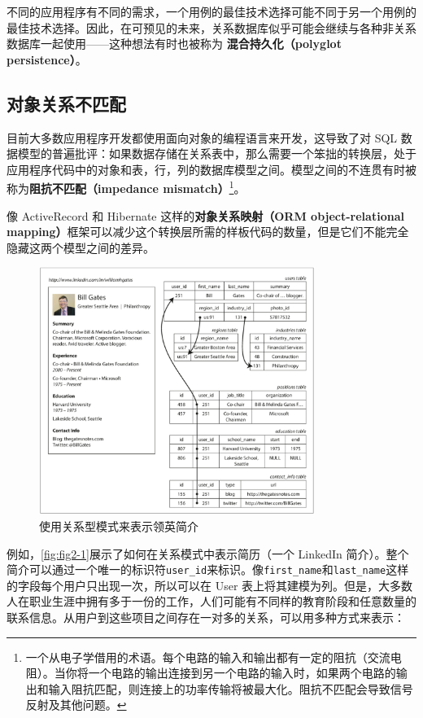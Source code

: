 不同的应用程序有不同的需求，一个用例的最佳技术选择可能不同于另一个用例的最佳技术选择。因此，在可预见的未来，关系数据库似乎可能会继续与各种非关系数据库一起使用——这种想法有时也被称为 \textbf{混合持久化（polyglot persistence）}。

\subsection{对象关系不匹配}

目前大多数应用程序开发都使用面向对象的编程语言来开发，这导致了对 SQL 数据模型的普遍批评：如果数据存储在关系表中，那么需要一个笨拙的转换层，处于应用程序代码中的对象和表，行，列的数据库模型之间。模型之间的不连贯有时被称为\textbf{阻抗不匹配（impedance mismatch）}\footnote{一个从电子学借用的术语。每个电路的输入和输出都有一定的阻抗（交流电阻）。当你将一个电路的输出连接到另一个电路的输入时，如果两个电路的输出和输入阻抗匹配，则连接上的功率传输将被最大化。阻抗不匹配会导致信号反射及其他问题。}。

像 ActiveRecord 和 Hibernate 这样的\textbf{对象关系映射（ORM object-relational mapping）}框架可以减少这个转换层所需的样板代码的数量，但是它们不能完全隐藏这两个模型之间的差异。

\begin{figure}
    \includegraphics[width=0.8\textwidth]{img/fig2-1.png}
    \caption{使用关系型模式来表示领英简介}
    \label{fig:fig2-1}
\end{figure}

例如，\autoref{fig:fig2-1}展示了如何在关系模式中表示简历（一个 LinkedIn 简介）。整个简介可以通过一个唯一的标识符\texttt{user\_id}来标识。像\texttt{first\_name}和\texttt{last\_name}这样的字段每个用户只出现一次，所以可以在 User 表上将其建模为列。但是，大多数人在职业生涯中拥有多于一份的工作，人们可能有不同样的教育阶段和任意数量的联系信息。从用户到这些项目之间存在一对多的关系，可以用多种方式来表示：

